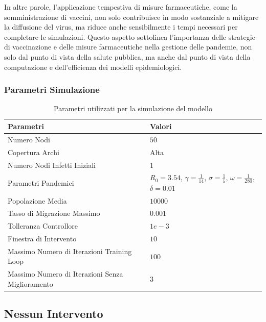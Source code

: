 In altre parole, l'applicazione tempestiva di misure farmaceutiche, 
come la somministrazione di vaccini, non solo contribuisce in modo 
sostanziale a mitigare la diffusione del virus, ma riduce anche 
sensibilmente i tempi necessari per completare le simulazioni. 
Questo aspetto sottolinea l'importanza delle strategie di vaccinazione 
e delle misure farmaceutiche nella gestione delle pandemie, 
non solo dal punto di vista della salute pubblica, ma anche dal punto 
di vista della computazione e dell'efficienza dei modelli epidemiologici.

\subsubsection*{Parametri Simulazione}

\begin{table}[H]
    \centering
    \caption{Parametri utilizzati per la simulazione del modello}
    \begin{tabular}{ |p{6.5cm}||p{6.5cm}| } 
		\hline
		\textbf{Parametri} & \textbf{Valori} \\ 
		\hline
		Numero Nodi & $50$ \\
		Copertura Archi & Alta \\
		Numero Nodi Infetti Iniziali & $1$ \\
		Parametri Pandemici & $R_0 = 3.54$, $\gamma = \frac{1}{14}$, $\sigma = \frac{1}{5}$, $\omega = \frac{1}{280}$, $\delta = 0.01$ \\
		Popolazione Media & $10000$ \\
		Tasso di Migrazione Massimo & $0.001$ \\
		Tolleranza Controllore & $1e-3$ \\
		Finestra di Intervento & $10$ \\
		Massimo Numero di Iterazioni Training Loop & $100$ \\
		Massimo Numero di Iterazioni Senza Miglioramento & $3$ \\
		\hline
		\end{tabular}
\end{table}

\subsection{Nessun Intervento}

